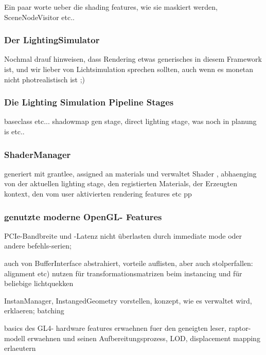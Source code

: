 
\label{sec:visualDomain}
	
Ein paar worte ueber die shading features, wie sie maskiert werden, SceneNodeVisitor etc..

\subsubsection{Der LightingSimulator}
	Nochmal drauf hinweisen, dass Rendering etwas generisches in diesem Framework ist, und wir lieber von Lichtsimulation sprechen sollten, auch wenn es monetan nicht photrealistisch ist ;)

\subsubsection{Die Lighting Simulation Pipeline Stages}
	baseclass etc...
	shadowmap gen stage, direct lighting stage, was noch in planung is etc..	

\subsubsection{ShaderManager}
	generiert mit grantlee, assigned an materials und verwaltet Shader , abhaenging von der aktuellen lighting stage, den registierten Materials,
	der Erzeugten kontext, den vom user aktivierten rendering features etc pp

\subsubsection{genutzte moderne OpenGL- Features}	
	\label{sec:usedOpenGLfeatures}

	PCIe-Bandbreite und -Latenz nicht überlasten durch immediate mode oder andere befehls-serien;

	auch von BufferInterface abstrahiert, vorteile auflisten, aber auch stolperfallen: alignment etc)	
	nutzen für transformationsmatrizen beim instancing und für beliebige lichtquekken

	
	InstanManager, InstangedGeometry vorstellen, konzept, wie es verwaltet wird, erklaeren;
	batching
	
	basics des GL4- hardware features erwaehnen fuer den geneigten leser, raptor-modell erwaehnen und seinen 		
	Aufbereitungsprozess, LOD, displacement mapping erlaeutern	
	
